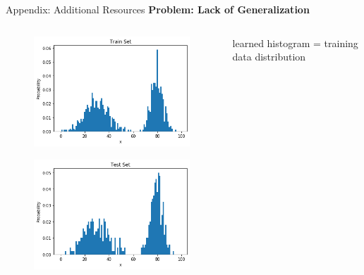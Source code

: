 \begin{frame}[allowframebreaks]{Appendix: Additional Resources}
\large
\textbf{Problem: Lack of Generalization}
\normalsize
\begin{columns}
    \begin{column}{0.45\textwidth}
        \begin{figure}
            \centering
            \includegraphics[width=\textwidth,keepaspectratio]{images/arm/histogram_training.png}
        \end{figure}
        \begin{figure}
            \centering
            \includegraphics[width=\textwidth,keepaspectratio]{images/arm/histogram_test.png}
        \end{figure}
    \end{column}
    \begin{column}{0.55\textwidth}
       learned histogram = training data distribution 


\end{column}
\end{columns}
\end{frame}
